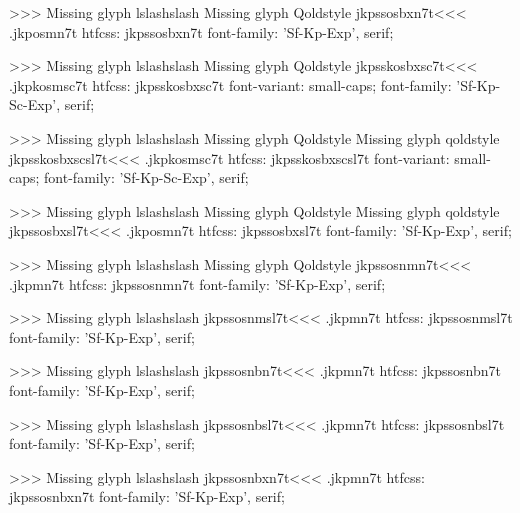 >>>
Missing glyph	lslashslash
Missing glyph	Qoldstyle
\<jkpssosbxn7t\><<<
.jkposmn7t
htfcss:  jkpssosbxn7t  font-family: 'Sf-Kp-Exp', serif;

>>>
Missing glyph	lslashslash
Missing glyph	Qoldstyle
\<jkpsskosbxsc7t\><<<
.jkpkosmsc7t
htfcss:  jkpsskosbxsc7t  font-variant: small-caps; font-family: 'Sf-Kp-Sc-Exp', serif;

>>>
Missing glyph	lslashslash
Missing glyph	Qoldstyle
Missing glyph	qoldstyle
\<jkpsskosbxscsl7t\><<<
.jkpkosmsc7t
htfcss:  jkpsskosbxscsl7t  font-variant: small-caps; font-family: 'Sf-Kp-Sc-Exp', serif;

>>>
Missing glyph	lslashslash
Missing glyph	Qoldstyle
Missing glyph	qoldstyle
\<jkpssosbxsl7t\><<<
.jkposmn7t
htfcss:  jkpssosbxsl7t  font-family: 'Sf-Kp-Exp', serif;

>>>
Missing glyph	lslashslash
Missing glyph	Qoldstyle
\<jkpssosnmn7t\><<<
.jkpmn7t
htfcss:  jkpssosnmn7t  font-family: 'Sf-Kp-Exp', serif;

>>>
Missing glyph	lslashslash
\<jkpssosnmsl7t\><<<
.jkpmn7t
htfcss:  jkpssosnmsl7t  font-family: 'Sf-Kp-Exp', serif;

>>>
Missing glyph	lslashslash
\<jkpssosnbn7t\><<<
.jkpmn7t
htfcss:  jkpssosnbn7t  font-family: 'Sf-Kp-Exp', serif;

>>>
Missing glyph	lslashslash
\<jkpssosnbsl7t\><<<
.jkpmn7t
htfcss:  jkpssosnbsl7t  font-family: 'Sf-Kp-Exp', serif;

>>>
Missing glyph	lslashslash
\<jkpssosnbxn7t\><<<
.jkpmn7t
htfcss:  jkpssosnbxn7t  font-family: 'Sf-Kp-Exp', serif;

